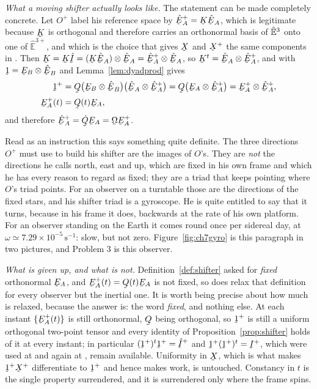 \begin{remark}
\emph{What a moving shifter actually looks like.} The statement can be
made completely concrete. Let $O^{+}$ label his reference space by
$\hbE^{+}_{A}=\bK\hbE_{A}$, which is legitimate because $\bK$ is
orthogonal and therefore carries an orthonormal basis of $\hat{\mathbb{E}}^{3}$ onto one
of $\hat{\mathbb{E}}^{3+}$, and which is the choice that gives $\bX$ and
$\bX^{+}$ the same components in . Then
$\bK=\bK\hI=(\bK\hbE_{A})\otimes\hbE_{A}=\hbE^{+}_{A}\otimes\hbE_{A}$, so
$\bK^{t}=\hbE_{A}\otimes\hbE^{+}_{A}$, and  with
$\shift=\bE_{B}\otimes\hbE_{B}$ and Lemma~\ref{lem:dyadprod} gives
\[
\begin{aligned}
   \shift^{+}
   &=\bQ\big(\bE_{B}\otimes\hbE_{B}\big)
    \big(\hbE_{A}\otimes\hbE^{+}_{A}\big)
   =\bQ\big(\bE_{A}\otimes\hbE^{+}_{A}\big)
   =\bE^{+}_{A}\otimes\hbE^{+}_{A},\\[0.6mm]
   \bE^{+}_{A}(t)&=\bQ(t)\bE_{A},
\end{aligned}
\]
and therefore $\dot\bE^{+}_{A}=\dot\bQ\bE_{A}=\bOm\bE^{+}_{A}$.

Read as an instruction this says something quite definite. The three
directions $O^{+}$ must use to build his shifter are the images of
$O$'s. They are \emph{not} the directions he calls north, east and up,
which are fixed in his own frame and which he has every reason to regard
as fixed; they are a triad that keeps pointing where $O$'s triad points.
For an observer on a turntable those are the directions of the fixed
stars, and his shifter triad is a gyroscope. He is quite entitled to say
that it turns, because in his frame it does, backwards at the rate of his
own platform. For an observer standing on the Earth it comes round once
per sidereal day, at $\omega\simeq7.29\times10^{-5}\,\mathrm{s}^{-1}$:
slow, but not zero. Figure~\ref{fig:ch7gyro} is this paragraph in two
pictures, and Problem 3 is this observer.

\emph{What is given up, and what is not.} Definition~\ref{def:shifter}
asked for \emph{fixed} orthonormal $\bE_{A}$, and
$\bE^{+}_{A}(t)=\bQ(t)\bE_{A}$ is not fixed, so  does relax
that definition for every observer but the inertial one. It is worth
being precise about how much is relaxed, because the answer is: the word
\emph{fixed}, and nothing else. At each instant $\{\bE^{+}_{A}(t)\}$ is
still orthonormal, $\bQ$ being orthogonal, so $\shift^{+}$ is still a
uniform orthogonal two-point tensor and every identity of
Proposition~\ref{prop:shifter} holds of it at every instant; in
particular $(\shift^{+})^{t}\shift^{+}=\hI^{+}$ and
$\shift^{+}(\shift^{+})^{t}=\I^{+}$, which were used at  and
again at , remain available. Uniformity in $\bX$, which is what
makes $\shift^{+}\bX^{+}$ differentiate to $\shift^{+}$ and hence makes
 work, is untouched. Constancy in $t$ is the single property
surrendered, and it is surrendered only where the frame spins.


\end{remark}
